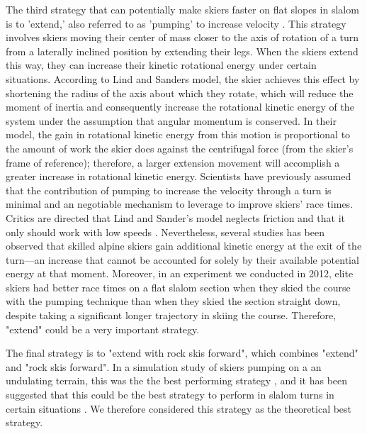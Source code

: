 The third strategy that can potentially make skiers faster on flat slopes in slalom is to 'extend,' also referred to as 'pumping' to increase velocity \cite{lind_physics_2013}. This strategy involves skiers moving their center of mass closer to the axis of rotation of a turn from a laterally inclined position by extending their legs. When the skiers extend this way, they can increase their kinetic rotational energy under certain situations. According to Lind and Sanders \cite{lind_physics_2004} model, the skier achieves this effect by shortening the radius of the axis about which they rotate, which will reduce the moment of inertia and consequently increase the rotational kinetic energy of the system under the assumption that angular momentum is conserved. In their model, the gain in rotational kinetic energy from this motion is proportional to the amount of work the skier does against the centrifugal force (from the skier's frame of reference); therefore, a larger extension movement will accomplish a greater increase in rotational kinetic energy. Scientists have previously assumed that the contribution of pumping to increase the velocity through a turn is minimal and an negotiable mechanism to leverage to improve skiers' race times\cite{supej_differential_2008}. Critics are directed that Lind and Sander's model neglects friction and that it only should work with low speeds \cite{supej_differential_2008, supej_how_2010}. Nevertheless, several studies has been observed that skilled alpine skiers gain additional kinetic energy at the exit of the turn—an increase that cannot be accounted for solely by their available potential energy at that moment\cite{reid_kinematic_2010, supej_how_2010, supej_differential_2008}. Moreover, in an experiment we conducted in 2012, elite skiers had better race times on a flat slalom section when they skied the course with the pumping technique than when they skied the section straight down, despite taking a significant longer trajectory in skiing the course. Therefore, "extend" could be a very important strategy.  

The final strategy is to "extend with rock skis forward", which combines "extend" and "rock skis forward". In a simulation study of skiers pumping on a an undulating terrain, this was the the best performing strategy \cite{mote_accelerations_1983}, and it has been suggested that this could be the best strategy to perform in slalom turns in certain situations \cite{reid_kinematic_2010}. We therefore considered this strategy as the theoretical best strategy. 

